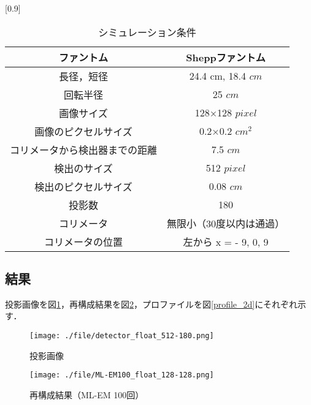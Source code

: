 \documentclass[dvipdfmx,autodetect-engine,twocolumn,10pt]{jsarticle}%
\begin{document}
\begin{table}[htbp]
  \begin{center}
    \caption{シミュレーション条件}
    \label{simu_2d}
    \small
    \scalebox{0.82}[0.9]
    {
      \begin{tabular}{|c|c|} \hline
        ファントム & Sheppファントム \\ \hline
        長径，短径 & 24.4 cm, 18.4 $cm$ \\ \hline
        回転半径 & 25 $cm$ \\ \hline
        画像サイズ & 128×128 $pixel$ \\ \hline
        画像のピクセルサイズ & 0.2×0.2 $cm^2$ \\ \hline
        コリメータから検出器までの距離 & 7.5 $cm$ \\ \hline
        検出のサイズ & 512 $pixel$ \\ \hline
        検出のピクセルサイズ & 0.08 $cm$ \\ \hline
        投影数 & 180 \\ \hline
        コリメータ & 無限小（30度以内は通過） \\ \hline
        コリメータの位置 & 左から x = - 9, 0, 9 \\ \hline
      \end{tabular}
    }
  \end{center}
\end{table}

\subsection{結果}
投影画像を図\ref{proj_2d}，再構成結果を図\ref{reconst_2d}，プロファイルを図\ref{profile_2d}にそれぞれ示す．

\begin{figure}[htbp]
  \begin{center}
    \texttt{[image: ./file/detector\_float\_512-180.png]}\\
    \caption{投影画像}
    \label{proj_2d}
  \end{center}
\end{figure}

\begin{figure}[htbp]
  \begin{center}
    \texttt{[image: ./file/ML-EM100\_float\_128-128.png]}\\
    \caption{再構成結果（ML-EM 100回）}
    \label{reconst_2d}
  \end{center}
\end{figure}
\end{document}
